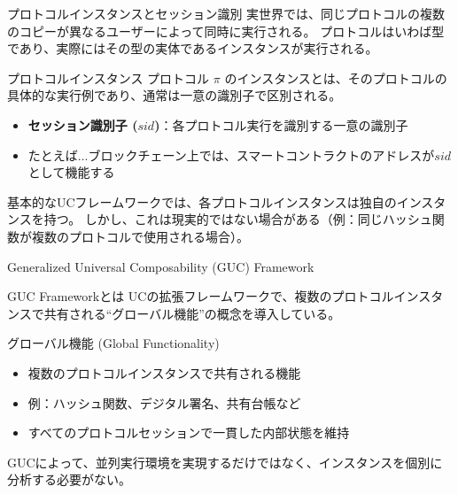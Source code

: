 \documentclass[aspectratio=169,10pt]{beamer}
\newenvironment{proofblock}[1][]
{\begin{block}{#1}\vspace{0.5em}}
{\vspace{0.5em}\end{block}}
\newenvironment{outlineblock}[1][]
{\begin{tcolorbox}[colframe=black, colback=white, boxrule=1pt, boxsep=5pt]}
{\end{tcolorbox}}
\begin{document}
\begin{frame}{プロトコルインスタンスとセッション識別}
  実世界では、同じプロトコルの複数のコピーが異なるユーザーによって同時に実行される。
  プロトコルはいわば型であり、実際にはその型の実体であるインスタンスが実行される。
  
  \begin{proofblock}[プロトコルインスタンス]
    プロトコル $\pi$ のインスタンスとは、そのプロトコルの具体的な実行例であり、通常は一意の識別子で区別される。
  \end{proofblock}
  
  \begin{itemize}
    \item \textbf{セッション識別子 ($sid$)}：各プロトコル実行を識別する一意の識別子
    \item たとえば...ブロックチェーン上では、スマートコントラクトのアドレスが$sid$として機能する
  \end{itemize}
  
  \begin{outlineblock}{}
    基本的なUCフレームワークでは、各プロトコルインスタンスは独自のインスタンスを持つ。
    しかし、これは現実的ではない場合がある（例：同じハッシュ関数が複数のプロトコルで使用される場合）。
  \end{outlineblock}
\end{frame}

\begin{frame}{Generalized Universal Composability (GUC) Framework}
  \begin{proofblock}[GUC Frameworkとは]
    UCの拡張フレームワークで、複数のプロトコルインスタンスで共有される``グローバル機能''の概念を導入している。
  \end{proofblock}
  
  \begin{proofblock}[グローバル機能 (Global Functionality)]
    \begin{itemize}
      \item 複数のプロトコルインスタンスで共有される機能
      \item 例：ハッシュ関数、デジタル署名、共有台帳など
      \item すべてのプロトコルセッションで一貫した内部状態を維持
    \end{itemize}
  \end{proofblock}

  GUCによって、並列実行環境を実現するだけではなく、インスタンスを個別に分析する必要がない。
\end{frame}
\end{document}
